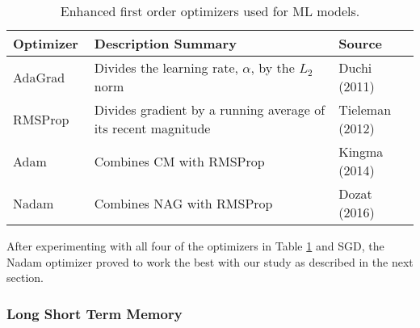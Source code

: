 %
\begin{table}[H]
\centering
\caption{Enhanced first order optimizers used for ML models.}
\label{tb-optimizers}
\begin{tabular}{@{}p{0.2\linewidth}p{0.6\linewidth}p{0.2\linewidth}@{}}
\toprule
\textbf{Optimizer} & \textbf{Description Summary} & \textbf{Source} \\ \midrule
AdaGrad & Divides the learning rate, $\alpha$, by the $L_{2}$ norm & Duchi (2011) \\
RMSProp & Divides gradient by a running average of its recent magnitude & Tieleman (2012) \\
Adam & Combines CM with RMSProp & Kingma (2014) \\
Nadam & Combines NAG with RMSProp & Dozat (2016) \\ \bottomrule
\end{tabular}
\end{table}	

%
After experimenting with all four of the optimizers in Table \ref{tb-optimizers} and SGD, the Nadam optimizer proved to work the best with our study as described in the next section.

\subsubsection{Long Short Term Memory}

